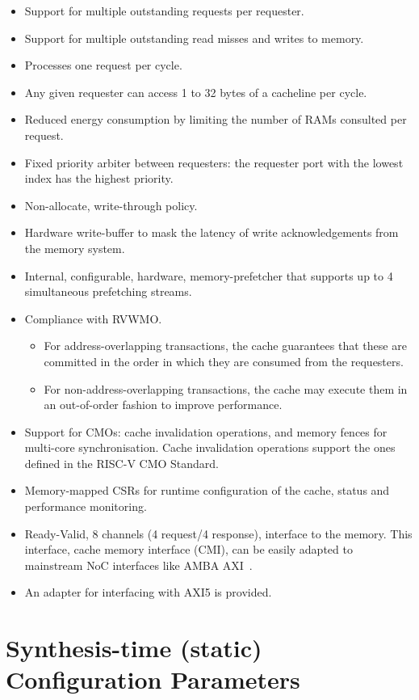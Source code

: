 \documentclass[10pt,titlepage,twoside]{book}
\begin{document}
\begin{itemize}[itemsep=0em]
\item Support for multiple outstanding requests per requester.
\item Support for multiple outstanding read misses and writes to memory.
\item Processes one request per cycle.
\item Any given requester can access 1 to 32 bytes of a cacheline per cycle.
\item Reduced energy consumption by limiting the number of RAMs consulted per request.
\item Fixed priority arbiter between requesters: the requester port with the lowest index has the highest priority.
\item Non-allocate, write-through policy.
\item Hardware write-buffer to mask the latency of write acknowledgements from the memory system.
\item Internal, configurable, hardware, memory-prefetcher that supports up to 4 simultaneous prefetching streams.
\item Compliance with \ac{RVWMO}.
  \begin{itemize}
  \item For address-overlapping transactions, the cache guarantees that these are committed in the order in which they are consumed from the requesters.
  \item For non-address-overlapping transactions, the cache may execute them in an out-of-order fashion to improve performance.
  \end{itemize}
\item Support for \acp{CMO}: cache invalidation operations, and memory fences for multi-core synchronisation. Cache invalidation operations support the ones defined in the RISC-V CMO Standard.
\item Memory-mapped \acp{CSR} for runtime configuration of the cache, status and performance monitoring.
\item Ready-Valid, 8 channels (4 request/4 response), interface to the memory. This interface, cache memory interface (CMI), can be easily adapted to mainstream \ac{NoC} interfaces like \acs{AMBA} AXI~\cite{arm_amba_2017}.
\item An adapter for interfacing with AXI5 is provided.
\end{itemize}

\newpage
\section{Synthesis-time (static) Configuration Parameters}
\end{document}
